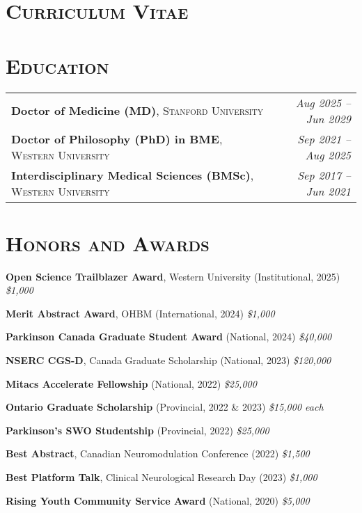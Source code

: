 \section*{\textsc{Curriculum Vitae}}

\section*{\textsc{Education}} \noindent\hrulefill \vspace{0.5em}
\begin{tabularx}{\textwidth}{@{}X r@{}}
\textbf{Doctor of Medicine (MD)}, \textsc{Stanford University} & \textit{Aug 2025 – Jun 2029} \\
\textbf{Doctor of Philosophy (PhD) in BME}, \textsc{Western University} & \textit{Sep 2021 – Aug 2025} \\
\textbf{Interdisciplinary Medical Sciences (BMSc)}, \textsc{Western University} & \textit{Sep 2017 – Jun 2021} \\
\end{tabularx}

\vspace{0.5em}
\section*{\textsc{Honors and Awards}} \noindent\hrulefill \vspace{0.5em}
  \item \textbf{Open Science Trailblazer Award}, Western University (Institutional, 2025) \hfill \textit{\$1,000}
  \item \textbf{Merit Abstract Award}, OHBM (International, 2024) \hfill \textit{\$1,000}
  \item \textbf{Parkinson Canada Graduate Student Award} (National, 2024) \hfill \textit{\$40,000}
  \item \textbf{NSERC CGS-D}, Canada Graduate Scholarship (National, 2023) \hfill \textit{\$120,000}
  \item \textbf{Mitacs Accelerate Fellowship} (National, 2022) \hfill \textit{\$25,000}
  \item \textbf{Ontario Graduate Scholarship} (Provincial, 2022 \& 2023) \hfill \textit{\$15,000 each}
  \item \textbf{Parkinson’s SWO Studentship} (Provincial, 2022) \hfill \textit{\$25,000}
  \item \textbf{Best Abstract}, Canadian Neuromodulation Conference (2022) \hfill \textit{\$1,500}
  \item \textbf{Best Platform Talk}, Clinical Neurological Research Day (2023) \hfill \textit{\$1,000}
  \item \textbf{Rising Youth Community Service Award} (National, 2020) \hfill \textit{\$5,000}

